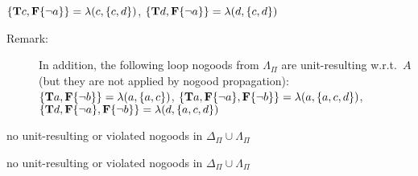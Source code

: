 \begin{Loesung}
{\begin{UList}
      $\{\mathbf{T}c,\mathbf{F}\{{\neg{a}}\}\}=                     \lambda(c,\{c,d\})$,\newline
      $\{\mathbf{T}d,\mathbf{F}\{{\neg{a}}\}\}=                     \lambda(d,\{c,d\})$
      \begin{description}
      \item[Remark:]
      In addition, the following loop nogoods from $\Lambda_\Pi$ are unit-resulting w.r.t.~$A$
      (but they are not applied by nogood propagation):\newline
      $\{\mathbf{T}a,\mathbf{F}\{{\neg{b}}\}\}=\lambda(a,\{a,c\})$,\newline
      $\{\mathbf{T}a,\mathbf{F}\{{\neg{a}}\},\mathbf{F}\{{\neg{b}}\}\}=                       \lambda(a,\{a,c,d\})$,\newline
      $\{\mathbf{T}d,\mathbf{F}\{{\neg{a}}\},\mathbf{F}\{{\neg{b}}\}\}=                       \lambda(d,\{a,c,d\})$
      \end{description}
\item no unit-resulting or violated nogoods in $\Delta_\Pi\cup\Lambda_\Pi$
\item no unit-resulting or violated nogoods in $\Delta_\Pi\cup\Lambda_\Pi$
\end{UList}}
\end{Loesung}

